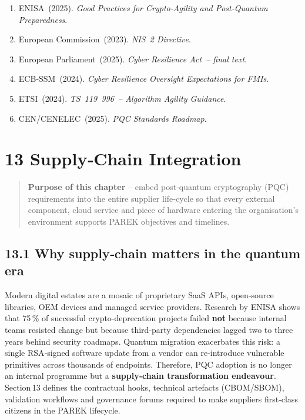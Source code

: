 \documentclass[
  english,
]{article}
\providecommand{\tightlist}{%
  \setlength{\itemsep}{0pt}\setlength{\parskip}{0pt}}
\begin{document}
\begin{enumerate}
\def\labelenumi{\arabic{enumi}.}
\tightlist
\item
  ENISA~(2025). \emph{Good Practices for Crypto‑Agility and Post‑Quantum
  Preparedness}.
\item
  European Commission~(2023). \emph{NIS~2 Directive}.
\item
  European Parliament~(2025). \emph{Cyber Resilience Act~-- final text}.
\item
  ECB‑SSM~(2024). \emph{Cyber Resilience Oversight Expectations for
  FMIs}.
\item
  ETSI~(2024). \emph{TS~119~996~-- Algorithm Agility Guidance}.
\item
  CEN/CENELEC~(2025). \emph{PQC Standards Roadmap}.
\end{enumerate}

\section{13 Supply‑Chain Integration}\label{supplychain-integration}

\begin{quote}
\textbf{Purpose of this chapter} -- embed post‑quantum cryptography
(PQC) requirements into the entire supplier life‑cycle so that every
external component, cloud service and piece of hardware entering the
organisation's environment supports PAREK objectives and timelines.
\end{quote}

\subsection{13.1 Why supply‑chain matters in the quantum
era}\label{why-supplychain-matters-in-the-quantum-era}

Modern digital estates are a mosaic of proprietary SaaS APIs,
open‑source libraries, OEM devices and managed service providers.
Research by ENISA shows that 75\,\% of successful crypto‑deprecation
projects failed \textbf{not} because internal teams resisted change but
because third‑party dependencies lagged two to three years behind
security roadmaps. Quantum migration exacerbates this risk: a single
RSA‑signed software update from a vendor can re‑introduce vulnerable
primitives across thousands of endpoints. Therefore, PQC adoption is no
longer an internal programme but a \textbf{supply‑chain transformation
endeavour}. Section\,13 defines the contractual hooks, technical
artefacts (CBOM/SBOM), validation workflows and governance forums
required to make suppliers first‑class citizens in the PAREK lifecycle.
\end{document}
